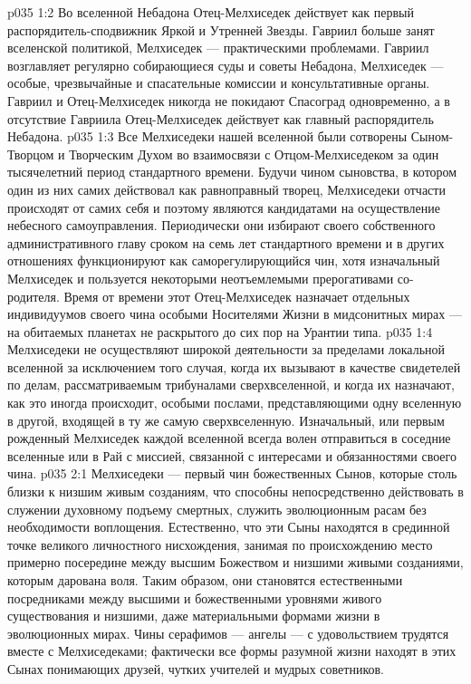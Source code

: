 \vs p035 1:2 Во вселенной Небадона Отец\hyp{}Мелхиседек действует как первый распорядитель\hyp{}сподвижник Яркой и Утренней Звезды. Гавриил больше занят вселенской политикой, Мелхиседек --- практическими проблемами. Гавриил возглавляет регулярно собирающиеся суды и советы Небадона, Мелхиседек --- особые, чрезвычайные и спасательные комиссии и консультативные органы. Гавриил и Отец\hyp{}Мелхиседек никогда не покидают Спасоград одновременно, а в отсутствие Гавриила Отец\hyp{}Мелхиседек действует как главный распорядитель Небадона.
\vs p035 1:3 Все Мелхиседеки нашей вселенной были сотворены Сыном\hyp{}Творцом и Творческим Духом во взаимосвязи с Отцом\hyp{}Мелхиседеком за один тысячелетний период стандартного времени. Будучи чином сыновства, в котором один из них самих действовал как равноправный творец, Мелхиседеки отчасти происходят от самих себя и поэтому являются кандидатами на осуществление небесного самоуправления. Периодически они избирают своего собственного административного главу сроком на семь лет стандартного времени и в других отношениях функционируют как саморегулирующийся чин, хотя изначальный Мелхиседек и пользуется некоторыми неотъемлемыми прерогативами со\hyp{}родителя. Время от времени этот Отец\hyp{}Мелхиседек назначает отдельных индивидуумов своего чина особыми Носителями Жизни в мидсонитных мирах --- на обитаемых планетах не раскрытого до сих пор на Урантии типа.
\vs p035 1:4 Мелхиседеки не осуществляют широкой деятельности за пределами локальной вселенной за исключением того случая, когда их вызывают в качестве свидетелей по делам, рассматриваемым трибуналами сверхвселенной, и когда их назначают, как это иногда происходит, особыми послами, представляющими одну вселенную в другой, входящей в ту же самую сверхвселенную. Изначальный, или первым рожденный Мелхиседек каждой вселенной всегда волен отправиться в соседние вселенные или в Рай с миссией, связанной с интересами и обязанностями своего чина.
\vs p035 2:1 Мелхиседеки --- первый чин божественных Сынов, которые столь близки к низшим живым созданиям, что способны непосредственно действовать в служении духовному подъему смертных, служить эволюционным расам без необходимости воплощения. Естественно, что эти Сыны находятся в срединной точке великого личностного нисхождения, занимая по происхождению место примерно посередине между высшим Божеством и низшими живыми созданиями, которым дарована воля. Таким образом, они становятся естественными посредниками между высшими и божественными уровнями живого существования и низшими, даже материальными формами жизни в эволюционных мирах. Чины серафимов --- ангелы --- с удовольствием трудятся вместе с Мелхиседеками; фактически все формы разумной жизни находят в этих Сынах понимающих друзей, чутких учителей и мудрых советников.
